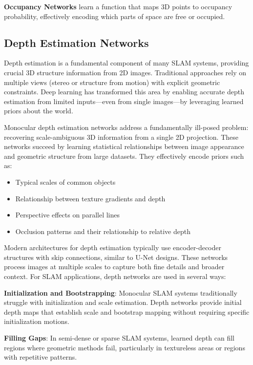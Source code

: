 \documentclass[12pt]{article}
\begin{document}
    \newpage
    \textbf{Occupancy Networks} learn a function that maps 3D points to occupancy probability, effectively encoding which parts of space are free or occupied.

    \newpage
    \subsection{Depth Estimation Networks}
    
    Depth estimation is a fundamental component of many SLAM systems, providing crucial 3D structure information from 2D images. Traditional approaches rely on multiple views (stereo or structure from motion) with explicit geometric constraints. Deep learning has transformed this area by enabling accurate depth estimation from limited inputs—even from single images—by leveraging learned priors about the world.
    
    Monocular depth estimation networks address a fundamentally ill-posed problem: recovering scale-ambiguous 3D information from a single 2D projection. These networks succeed by learning statistical relationships between image appearance and geometric structure from large datasets. They effectively encode priors such as:
    
    \begin{itemize}
        \item Typical scales of common objects
        \item Relationship between texture gradients and depth
        \item Perspective effects on parallel lines
        \item Occlusion patterns and their relationship to relative depth
    \end{itemize}
    
    \newpage

    Modern architectures for depth estimation typically use encoder-decoder structures with skip connections, similar to U-Net designs. These networks process images at multiple scales to capture both fine details and broader context.
    For SLAM applications, depth networks are used in several ways:
    
    \textbf{Initialization and Bootstrapping}: Monocular SLAM systems traditionally struggle with initialization and scale estimation. Depth networks provide initial depth maps that establish scale and bootstrap mapping without requiring specific initialization motions.
    
    \textbf{Filling Gaps}: In semi-dense or sparse SLAM systems, learned depth can fill regions where geometric methods fail, particularly in textureless areas or regions with repetitive patterns.
    
\end{document}
